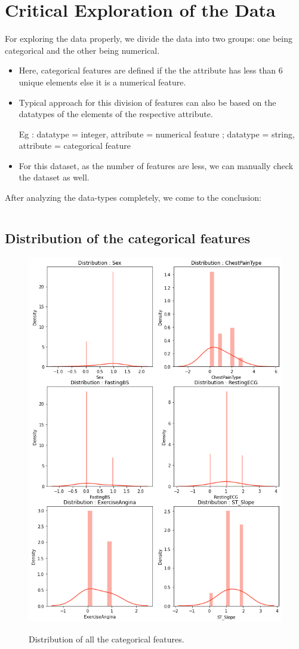 \chapter{Critical Exploration of the Data}
For exploring the data properly, we divide the data into two groups: one being categorical and the other being numerical. 

\begin{itemize}
    \item Here, categorical features are defined if the the attribute has less than 6 unique elements else it is a numerical feature.
    \item Typical approach for this division of features can also be based on the datatypes of the elements of the respective attribute.

    Eg : datatype = integer, attribute = numerical feature ; datatype = string, attribute = categorical feature
    \item For this dataset, as the number of features are less, we can manually check the dataset as well.    
\end{itemize}

After analyzing the data-types completely, we come to the conclusion:
\begin{listing}[!htpb]
\inputminted{octave}{Code/f1.m}
\end{listing}
\newpage 

\section{Distribution of the categorical features}
\begin{figure}[!htpb]
    \centering
    \includegraphics[width=0.6\linewidth]{Figures/Outputs/distr-of-catf.png}
    \label{Distribution of all categorical features}
    \caption{Distribution of all the categorical features.}
\end{figure}

